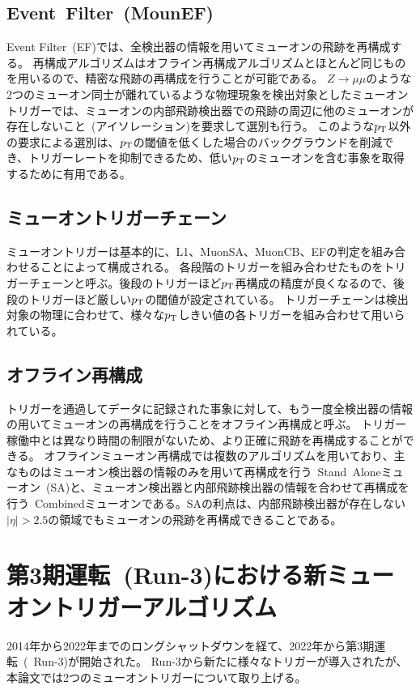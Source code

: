 \subsection{Event~Filter~(MounEF)}\label{chapter3-2-4}
Event Filter~(EF)では、全検出器の情報を用いてミューオンの飛跡を再構成する。
再構成アルゴリズムはオフライン再構成アルゴリズムとほとんど同じものを用いるので、精密な飛跡の再構成を行うことが可能である。
$Z\rightarrow\mu\mu$のような2つのミューオン同士が離れているような物理現象を検出対象としたミューオントリガーでは、ミューオンの内部飛跡検出器での飛跡の周辺に他のミューオンが存在しないこと~(アイソレーション)を要求して選別も行う。
このような$p_\mathrm{T}$以外の要求による選別は、$p_\mathrm{T}$の閾値を低くした場合のバックグラウンドを削減でき、トリガーレートを抑制できるため、低い$p_\mathrm{T}$のミューオンを含む事象を取得するために有用である。

\subsection{ミューオントリガーチェーン}\label{chapter3-2-5}
ミューオントリガーは基本的に、L1、MuonSA、MuonCB、EFの判定を組み合わせることによって構成される。
各段階のトリガーを組み合わせたものをトリガーチェーンと呼ぶ。後段のトリガーほど$p_\mathrm{T}$再構成の精度が良くなるので、後段のトリガーほど厳しい$p_\mathrm{T}$の閾値が設定されている。
トリガーチェーンは検出対象の物理に合わせて、様々な$p_\mathrm{T}$しきい値の各トリガーを組み合わせて用いられている。


\subsection{オフライン再構成}\label{chapter3-2-6}
トリガーを通過してデータに記録された事象に対して、もう一度全検出器の情報の用いてミューオンの再構成を行うことをオフライン再構成と呼ぶ。
トリガー稼働中とは異なり時間の制限がないため、より正確に飛跡を再構成することができる。
オフラインミューオン再構成では複数のアルゴリズムを用いており、主なものはミューオン検出器の情報のみを用いて再構成を行う~Stand~Aloneミューオン~(SA)と、ミューオン検出器と内部飛跡検出器の情報を合わせて再構成を行う~Combinedミューオンである。SAの利点は、内部飛跡検出器が存在しない$|\eta|>2.5$の領域でもミューオンの飛跡を再構成できることである。

\newpage

\section{第3期運転~(Run-3)における新ミューオントリガーアルゴリズム}\label{chapter3-3}
2014年から2022年までのロングシャットダウンを経て、2022年から第3期運転~(~Run-3)が開始された。
Run-3から新たに様々なトリガーが導入されたが、本論文では2つのミューオントリガーについて取り上げる。

